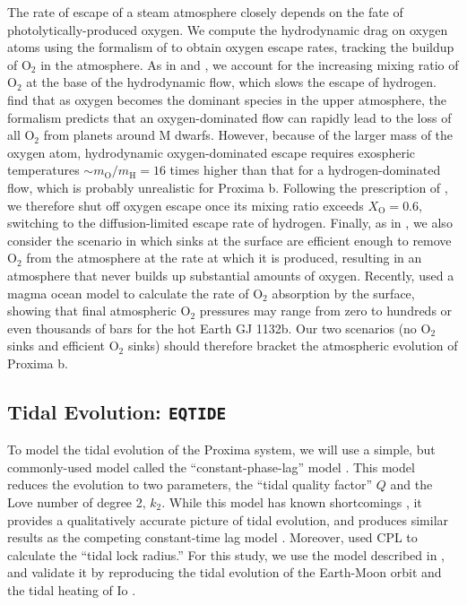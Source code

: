 \documentclass[preprint,12pt]{aastex}
\def\eqtide{\texttt{\footnotesize{EQTIDE}}\xspace}
\begin{document}
The rate of escape of a steam atmosphere closely depends on the fate
of photolytically-produced oxygen. We compute the hydrodynamic drag on
oxygen atoms using the formalism of \cite{Hunten87} to obtain oxygen
escape rates, tracking the buildup of O$_2$ in the atmosphere. As in
\cite{Tian15} and \cite{Schaefer16}, we account for the increasing
mixing ratio of O$_2$ at the base of the hydrodynamic flow, which
slows the escape of hydrogen. \cite{Tian15} find that as oxygen
becomes the dominant species in the upper atmosphere, the
\cite{Hunten87} formalism predicts that an oxygen-dominated flow can
rapidly lead to the loss of all O$_2$ from planets around M
dwarfs. However, because of the larger mass of the oxygen atom,
hydrodynamic oxygen-dominated escape requires exospheric temperatures
$\sim m_\mathrm{O}/m_\mathrm{H} = 16$ times higher than that for a
hydrogen-dominated flow, which is probably unrealistic for Proxima
b. Following the prescription of \cite{Schaefer16}, we therefore
shut off oxygen escape once its mixing ratio exceeds $X_\mathrm{O} =
0.6$, switching to the diffusion-limited escape rate of
hydrogen. Finally, as in \cite{LugerBarnes15}, we also consider the
scenario in which sinks at the surface are efficient enough to remove
O$_2$ from the atmosphere at the rate at which it is produced,
resulting in an atmosphere that never builds up substantial amounts of
oxygen. Recently, \cite{Schaefer16} used a magma ocean model to
calculate the rate of O$_2$ absorption by the surface, showing that
final atmospheric O$_2$ pressures may range from zero to hundreds or
even thousands of bars for the hot Earth GJ 1132b. Our two scenarios
(no O$_2$ sinks and efficient O$_2$ sinks) should therefore bracket
the atmospheric evolution of Proxima b.

\subsection{Tidal Evolution: \eqtide}
\label{sec:models:eqtide}
To model the tidal evolution of the Proxima system, we will use a
simple, but commonly-used model called the ``constant-phase-lag''
model \citep{Goldreich66,Greenberg09,Heller11}. This model reduces the
evolution to two parameters, the ``tidal quality factor'' $Q$ and the
Love number of degree 2, $k_2$. While this model has known
shortcomings \citep{ToumaWisdom94,EfroimskyMakarov13}, it provides a
qualitatively accurate picture of tidal evolution, and produces
similar results as the competing constant-time lag model
\citep{Heller10,Barnes13,Barnes16}. Moreover, \cite{Kasting93} used
CPL to calculate the ``tidal lock radius.'' For this study, we use the
model described in \cite{Heller11}, and validate it by reproducing the
tidal evolution of the Earth-Moon orbit \citep{MacDonald64} and the
tidal heating of Io \citep{Peale79}.
\end{document}
